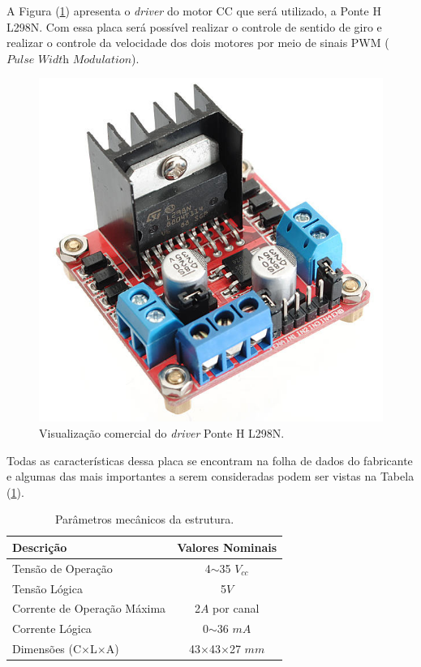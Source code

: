 A Figura (\ref{fig:PonteH}) apresenta o \textit{driver} do motor CC que será utilizado, a Ponte H L298N. Com essa placa será possível realizar o controle de sentido de giro e realizar o controle da velocidade dos dois motores por meio de sinais PWM ($\textit{Pulse Width Modulation}$).
\begin{figure}[H]
    \centering
    \includegraphics[scale=1]{Metodologia/L298N}
    \caption{Visualização comercial do \textit{driver} Ponte H L298N.}
    \label{fig:PonteH}
\end{figure}

Todas as características dessa placa se encontram na folha de dados do fabricante e algumas das mais importantes a serem consideradas podem ser vistas na Tabela (\ref{tab:CaracteristicaMPU}).
\begin{table}[!htb]\label{tab:CaracteristicaMPU}
\centering
\caption{Parâmetros mecânicos da estrutura.}
\begin{tabular}{lc}
\hline
\textbf{Descrição}              & \textbf{Valores Nominais}   \\ \hline
Tensão de Operação              & 4$\sim$35 $V_{cc}$          \\
Tensão Lógica                   & 5$V$                        \\
Corrente de Operação Máxima     & 2$A$ por canal              \\
Corrente Lógica                 & 0$\sim$36 $mA$              \\
Dimensões (C$\times$L$\times$A) & 43$\times$43$\times$27 $mm$ \\ \hline
\end{tabular}
\end{table}

